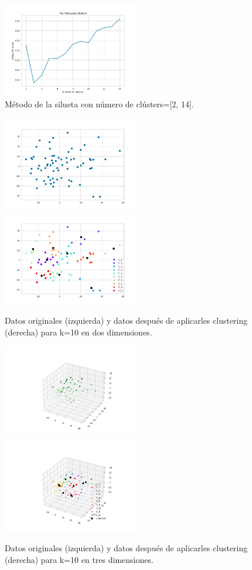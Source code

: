 \documentclass[10pt, a4paper]{article}
\begin{document}
		\begin{figure}[h!]
			\centering
			\includegraphics[width = 6cm]{SilhouetteM_bf.png}
			\caption{M\'etodo de la silueta con n\'umero de cl\'usters=[2, 14].}
		\end{figure}
		
		\begin{figure}[h!]
			\centering
			\includegraphics[width = 6cm]{Original_Data_2d_bf.png}
			\includegraphics[width = 6cm]{Clustered_Data_2d_k10_seed45_bf.png}
			\caption{Datos originales (izquierda) y datos despu\'es de aplicarles clustering (derecha) para k=10 en dos dimensiones.}
		\end{figure}
		
		\begin{figure}[h!]
			\centering
			\includegraphics[width = 6cm]{Original_Data_3d_bf.png}
			\includegraphics[width = 6cm]{Clustered_Data_3d_k10_seed45_bf.png}
			\caption{Datos originales (izquierda) y datos despu\'es de aplicarles clustering (derecha) para k=10 en tres dimensiones.}
		\end{figure}
		\newpage
		
\end{document}
